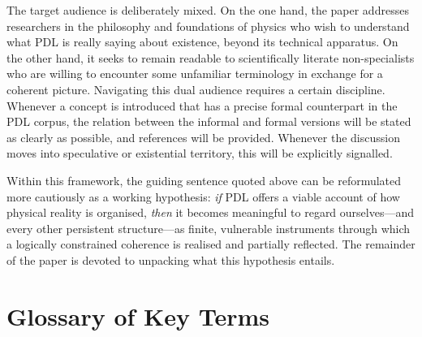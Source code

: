 \documentclass[11pt,a4paper]{article}
\theoremstyle{definition}
\begin{document}
The target audience is deliberately mixed. On the one hand, the paper addresses researchers in the philosophy and foundations of physics who wish to understand what PDL is really saying about existence, beyond its technical apparatus. On the other hand, it seeks to remain readable to scientifically literate non-specialists who are willing to encounter some unfamiliar terminology in exchange for a coherent picture. Navigating this dual audience requires a certain discipline. Whenever a concept is introduced that has a precise formal counterpart in the PDL corpus, the relation between the informal and formal versions will be stated as clearly as possible, and references will be provided. Whenever the discussion moves into speculative or existential territory, this will be explicitly signalled.

Within this framework, the guiding sentence quoted above can be reformulated more cautiously as a working hypothesis: \emph{if} PDL offers a viable account of how physical reality is organised, \emph{then} it becomes meaningful to regard ourselves---and every other persistent structure---as finite, vulnerable instruments through which a logically constrained coherence is realised and partially reflected. The remainder of the paper is devoted to unpacking what this hypothesis entails.

\section*{Glossary of Key Terms}
\end{document}
